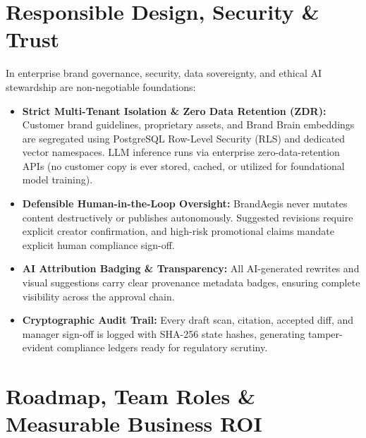 \documentclass[10pt,a4paper]{article}
\begin{document}
\clearpage


\section{Responsible Design, Security \& Trust}
\small In enterprise brand governance, security, data sovereignty, and ethical AI stewardship are non-negotiable foundations:
\begin{itemize}[leftmargin=*,itemsep=2.5pt]
  \item \textbf{Strict Multi-Tenant Isolation \& Zero Data Retention (ZDR):} Customer brand guidelines, proprietary assets, and Brand Brain embeddings are segregated using PostgreSQL Row-Level Security (RLS) and dedicated vector namespaces. LLM inference runs via enterprise zero-data-retention APIs (no customer copy is ever stored, cached, or utilized for foundational model training).
  \item \textbf{Defensible Human-in-the-Loop Oversight:} BrandAegis never mutates content destructively or publishes autonomously. Suggested revisions require explicit creator confirmation, and high-risk promotional claims mandate explicit human compliance sign-off.
  \item \textbf{AI Attribution Badging \& Transparency:} All AI-generated rewrites and visual suggestions carry clear provenance metadata badges, ensuring complete visibility across the approval chain.
  \item \textbf{Cryptographic Audit Trail:} Every draft scan, citation, accepted diff, and manager sign-off is logged with SHA-256 state hashes, generating tamper-evident compliance ledgers ready for regulatory scrutiny.
\end{itemize}

\vspace{0.15cm}

\section{Roadmap, Team Roles \& Measurable Business ROI}
\end{document}
